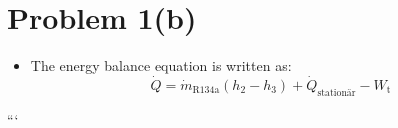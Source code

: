 \section*{Problem 1(b)}

\begin{itemize}
    \item The energy balance equation is written as:
    \[
    \dot{Q} = \dot{m}_{\text{R134a}} \left( h_2 - h_3 \right) + \dot{Q}_{\text{stationär}} - W_{\text{t}}
    \]
\end{itemize}

```